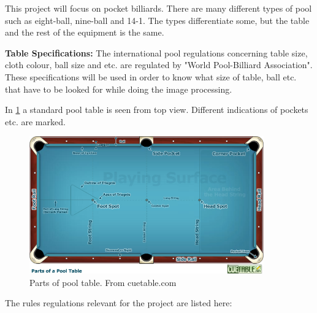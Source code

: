 This project will focus on pocket billiards. There are many different types of pool such as eight-ball, nine-ball and 14-1. The types differentiate some, but the table and the rest of the equipment is the same.

\textbf{Table Specifications:}
The international pool regulations concerning table size, cloth colour, ball size and etc. are regulated by "World Pool-Billiard Association"\cite{poolregulations}. These specifications will be used in order to know what size of table, ball etc. that have to be looked for while doing the image processing.

In \ref{fig:partspool} a standard pool table is seen from top view. Different indications of pockets etc. are marked.

\begin{figure}[htpb]
\begin{center}
\leavevmode
\includegraphics[width=0.9\textwidth]{images/pooltablespecs.jpg}
\end{center}
\caption{Parts of pool table. From cuetable.com}
\label{fig:partspool}
\end{figure}

The rules regulations relevant for the project are listed here:

